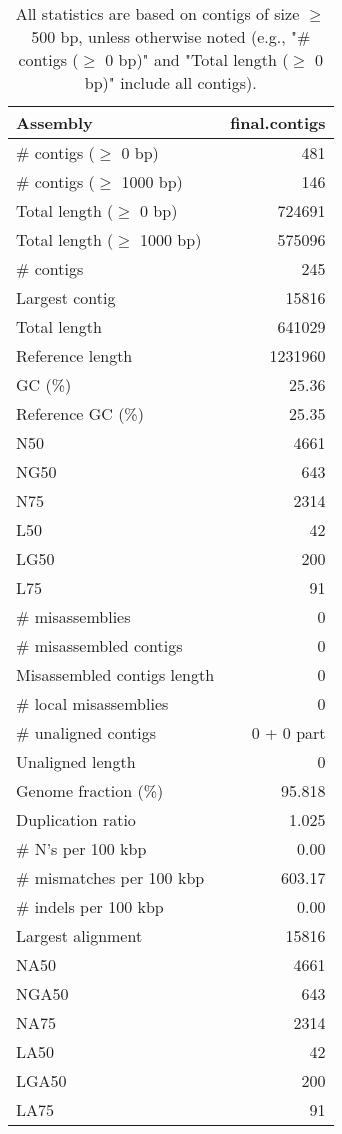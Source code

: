 \documentclass[12pt,a4paper]{article}
\begin{document}
\begin{table}[ht]
\begin{center}
\caption{All statistics are based on contigs of size $\geq$ 500 bp, unless otherwise noted (e.g., "\# contigs ($\geq$ 0 bp)" and "Total length ($\geq$ 0 bp)" include all contigs).}
\begin{tabular}{|l*{1}{|r}|}
\hline
Assembly & final.contigs \\ \hline
\# contigs ($\geq$ 0 bp) & 481 \\ \hline
\# contigs ($\geq$ 1000 bp) & 146 \\ \hline
Total length ($\geq$ 0 bp) & 724691 \\ \hline
Total length ($\geq$ 1000 bp) & 575096 \\ \hline
\# contigs & 245 \\ \hline
Largest contig & 15816 \\ \hline
Total length & 641029 \\ \hline
Reference length & 1231960 \\ \hline
GC (\%) & 25.36 \\ \hline
Reference GC (\%) & 25.35 \\ \hline
N50 & 4661 \\ \hline
NG50 & 643 \\ \hline
N75 & 2314 \\ \hline
L50 & 42 \\ \hline
LG50 & 200 \\ \hline
L75 & 91 \\ \hline
\# misassemblies & 0 \\ \hline
\# misassembled contigs & 0 \\ \hline
Misassembled contigs length & 0 \\ \hline
\# local misassemblies & 0 \\ \hline
\# unaligned contigs & 0 + 0 part \\ \hline
Unaligned length & 0 \\ \hline
Genome fraction (\%) & 95.818 \\ \hline
Duplication ratio & 1.025 \\ \hline
\# N's per 100 kbp & 0.00 \\ \hline
\# mismatches per 100 kbp & 603.17 \\ \hline
\# indels per 100 kbp & 0.00 \\ \hline
Largest alignment & 15816 \\ \hline
NA50 & 4661 \\ \hline
NGA50 & 643 \\ \hline
NA75 & 2314 \\ \hline
LA50 & 42 \\ \hline
LGA50 & 200 \\ \hline
LA75 & 91 \\ \hline
\end{tabular}
\end{center}
\end{table}
\end{document}
